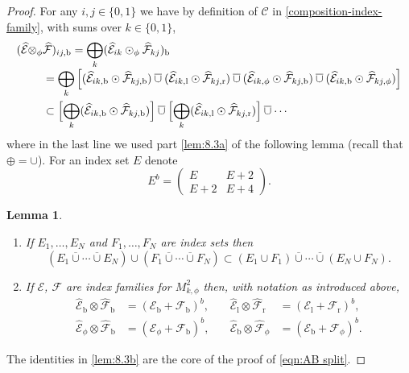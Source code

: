 \documentclass[JEP,XML,SOM,Unicode,NoFloatCountersInSection,published]{cedram}
\newenvironment{enumeratea}
{\bgroup\def\theenumi{\alph{enumi}}\begin{enumerate}}
{\end{enumerate}\egroup}
\theoremstyle{plain}
\newtheorem{Lemma}[Th]{Lemma}
\theoremstyle{definition}
\newcommand\calE{{\mathcal E}}
\newcommand\calF{{\mathcal F}}
\newcommand{\calEwhat}{{\widehat{\calE}}}
\newcommand{\calFwhat}{{\widehat{\calF}}}
\newcommand{\bb}{{\mathrm{b}}}
\renewcommand{\ll}{{\mathrm{l}}}
\newcommand{\rr}{{\mathrm{r}}}
\newcommand{\ocup}{\mathbin{\overline{\cup}}}
\begin{document}
\begin{proof}
For any $i,j\in\{0,1\}$ we have by definition of $\mathscr{C}$ in
\eqref{composition-index-family}, with sums over $k\in\{0,1\}$,
\begin{align}
(\calEwhat \otimes_\phi& \calFwhat)_{ij,\bb}
= \bigoplus_{k} (\calEwhat_{ik} \odot_\phi \calFwhat_{kj})_\bb
\notag\\[-3pt]
& = \bigoplus_k \left[ (\calEwhat_{ik,\bb} \odot \calFwhat_{kj,\bb}) \ocup (\calEwhat_{ik,\ll} \odot \calFwhat_{kj,\rr}) \ocup (\calEwhat_{ik,\phi} \odot \calFwhat_{kj,\bb}) \ocup
(\calEwhat_{ik,\bb} \odot \calFwhat_{kj,\phi})
\right]\label{eqn:E tensor F calc}
\\
& \subset \Bigl[ \bigoplus_k (\calEwhat_{ik,\bb} \odot \calFwhat_{kj,\bb}) \Bigr] \ocup
\Bigl[ \bigoplus_k (\calEwhat_{ik,\ll} \odot \calFwhat_{kj,\rr}) \Bigr] \ocup \cdots \notag
\end{align}
where in the last line we used part \eqref{lem:8.3a} of the following lemma (recall that $\oplus=\cup$). For an index set $E$ denote\vspace*{-3pt}
\[
E^b =
\begin{pmatrix}
E & E+2\\
E+2 & E+4
\end{pmatrix}.
\]

\skpt
\begin{Lemma}\label{lem:8.3}
\begin{enumeratea}
\item\label{lem:8.3a}
If $E_1,\dots,E_N$ and $F_1,\dots,F_N$ are index sets then
\[
(E_1\ocup\cdots\ocup E_N) \cup (F_1 \ocup\cdots\ocup F_N)
\subset (E_1\cup F_1) \ocup \cdots \ocup (E_N \cup F_N).
\]
\item\label{lem:8.3b}
If $\calE$, $\calF$ are index families for $M^2_{k,\phi}$ then, with notation as introduced above,
\begin{align*}
\calEwhat_\bb\otimes \calFwhat_\bb &= (\calE_\bb+\calF_\bb)^b,\quad
&\calEwhat_\ll\otimes \calFwhat_\rr &= (\calE_\ll+\calF_\rr)^b, \\
\calEwhat_\phi\otimes \calFwhat_\bb &= (\calE_\phi+\calF_\bb)^b,\quad
& \calEwhat_\bb\otimes \calFwhat_\phi &= (\calE_\bb+\calF_\phi)^b.
\end{align*}
\end{enumeratea}
\end{Lemma}
The identities in \eqref{lem:8.3b} are the core of the proof of \eqref{eqn:AB split}.


\end{proof}
\end{document}
